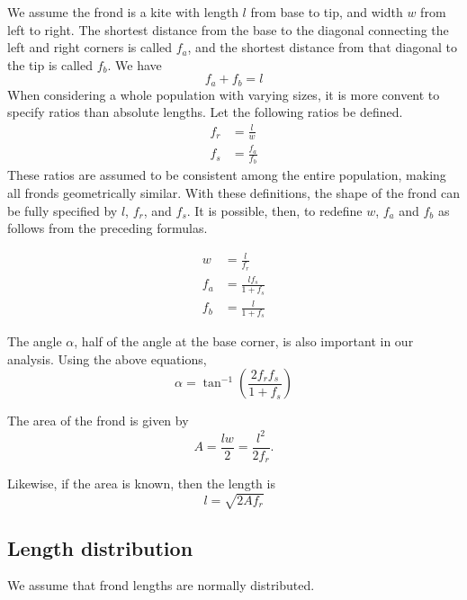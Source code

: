 We assume the frond is a kite with length $l$ from base to tip, and width $w$ from left to right.
 The shortest distance from the base to the diagonal connecting the left and right corners is called $f_a$, and the shortest distance from that diagonal to the tip is called $f_b$.
 We have
 \begin{equation}
	 f_a + f_b = l
 \end{equation}
When considering a whole population with varying sizes, it is more convent to specify ratios than absolute lengths.
Let the following ratios be defined.
\begin{align}
	f_r &= \frac{l}{w} \\
	f_s &= \frac{f_a}{f_b}
\end{align}
These ratios are assumed to be consistent among the entire population, making all fronds geometrically similar.
With these definitions, the shape of the frond can be fully specified by $l$, $f_r$, and $f_s$.
It is possible, then, to redefine $w$, $f_a$ and $f_b$ as follows from the preceding formulas.

\begin{align}
	w &= \frac{l}{f_r} \\
	f_a &= \frac{lf_s}{1+f_s} \\
	f_b &= \frac{l}{1+f_s}
\end{align}

The angle $\alpha$, half of the angle at the base corner, is also important in our analysis.
Using the above equations,
\begin{equation}
	\alpha = \tan^{-1}\left(\frac{2f_rf_s}{1+f_s}\right)
\end{equation}

The area of the frond is given by
\begin{equation}
  A = \frac{lw}{2} = \frac{l^2}{2f_r}.
\end{equation}

Likewise, if the area is known, then the length is
\begin{equation}
  l = \sqrt{2Af_r}
  \label{eqn:length-from-area}
\end{equation}

\subsection{Length distribution}

We assume that frond lengths are normally distributed.

